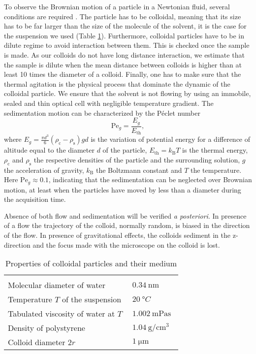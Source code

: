 \documentclass[%
 aip,
 jmp,%
 amsmath,amssymb,
reprint,%
]{revtex4-1}
\begin{document}
To observe the Brownian motion of a particle in a Newtonian fluid, several conditions are required \citep{16_CollSusp}. The particle has to be colloidal, meaning that its size has to be far larger than the size of the molecule of the solvent, it is the case for the suspension we used (Table \ref{TabParams}). Furthermore, colloidal particles have to be in dilute regime to avoid interaction between them. This is checked once the sample is made. As our colloids do not have long distance interaction, we estimate that the sample is dilute when the mean distance between colloids is higher than at least 10 times the diameter of a colloid. Finally, one has to make sure that the thermal agitation is the physical process that dominate the dynamic of the colloidal particle. We ensure that the solvent is not flowing by using an immobile, sealed and thin optical cell with negligible temperature gradient. The sedimentation motion can be characterized by the P\'eclet number \citep{12_patankar1980numerical}
\begin{equation}
\text{Pe}_g = \frac{E_g}{E_\text{th}},
\end{equation}
where $E_g = \frac{\pi d^3}{6}  (\rho_\text{c} - \rho_\text{s}) g  d$ is the variation of potential energy for a difference of altitude equal to the diameter $d$ of the particle, $E_\text{th} = k_\text{B} T$ is the thermal energy, $\rho_\text{c}$ and $\rho_\text{s}$ the respective densities of the particle and the surrounding solution, $g$ the acceleration of gravity, $k_\text{B}$ the Boltzmann constant and $T$ the temperature. Here $\text{Pe}_g \approx 0.1$, indicating that the sedimentation can be neglected over Brownian motion, at least when the particles have moved by less than a diameter during the acquisition time.


Absence of both flow and sedimentation will be verified \textit{a posteriori}. In presence of a flow the trajectory of the colloid, normally random, is biased in the direction of the flow. In presence of gravitational effects, the colloids sediment in the z-direction and the focus made with the microscope on the colloid is lost. 

\begin{table}
\begin{tabular}{m{0.7\linewidth}m{0.28\linewidth}}
  \hline\\[-0.8em]
  Molecular diameter of water \citep{17_marcus1998properties}  & $\SI{0.34}{\nano\meter}$\\
  Temperature $T$ of the suspension & $\SI{20}{\degree C}$ \\
  Tabulated viscosity of water at $T$ & $\SI{1.002}{\milli\pascal\second}$ \\
  Density of polystyrene & $\SI{1.04}{\gram\per\centi\meter\cubed}$ \\
  Colloid diameter $2r$ & $\SI{1}{\micro\meter}$\\
  \hline
  \end{tabular}
  \caption{Properties of colloidal particles and their medium}
  \label{TabParams}
\end{table}
\end{document}
